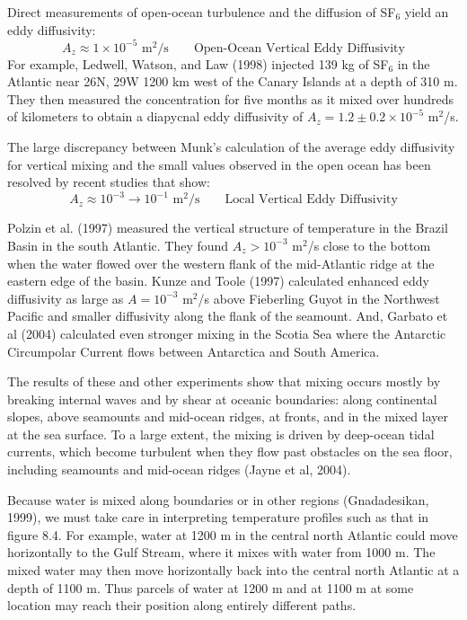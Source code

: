 Direct measurements of open-ocean
turbulence and the diffusion of
SF$_6$ yield an eddy diffusivity:
\begin{equation}
A_z \approx 1 \times 10^{-5} \text{ m$^2$/s} \qquad \text{Open-Ocean Vertical
Eddy Diffusivity}
\end{equation}
For example, Ledwell, Watson, and Law (1998) injected 139 kg of SF$_6$
in the Atlantic near 26\degrees N, 29\degrees W 1200 km west of the
Canary Islands at a depth of 310 m. They then measured the
concentration for five months as it mixed over hundreds of kilometers
to obtain a diapycnal eddy
diffusivity of
$A_z = 1.2 \pm 0.2 \times 10^{-5}$ m$^2$/s.

The large discrepancy between Munk's calculation of the average eddy
diffusivity for vertical mixing and the small values observed in the
open ocean has been resolved by recent studies that show:
\begin{equation}
A_z \approx 10^{-3} \to 10^{-1} \text{ m$^2$/s} \qquad \text{Local Vertical Eddy Diffusivity}
\end{equation}

Polzin et al. (1997) measured the vertical structure of temperature in
the Brazil Basin in the south Atlantic. They found $A_z > 10^{-3}$
m$^2$/s close to the bottom when the water flowed over the western
flank of the mid-Atlantic ridge at the eastern edge of the
basin. Kunze and Toole (1997) calculated enhanced eddy diffusivity as
large as $A= 10^{-3}$ m$^2$/s above Fieberling Guyot in the Northwest
Pacific and smaller diffusivity along the flank of the seamount. And,
Garbato et al (2004) calculated even stronger mixing in the Scotia Sea
where the Antarctic Circumpolar Current flows between Antarctica and
South America.

The results of these and other experiments show that mixing occurs
mostly by breaking internal waves and by shear at oceanic boundaries:
along continental slopes, above seamounts and mid-ocean ridges, at
fronts, and in the mixed layer at the sea
surface. To a large extent, the mixing is driven by deep-ocean tidal
currents, which
become turbulent when they flow past obstacles on the sea floor,
including seamounts and mid-ocean ridges (Jayne et al, 2004).

Because water is mixed along boundaries or in other regions
(Gnadadesikan, 1999), we must take care in interpreting temperature
profiles such as that in figure 8.4. For example, water at 1200 m in
the central north Atlantic could move horizontally to the Gulf
Stream, where it mixes with water from
1000 m. The mixed water may then move horizontally back into the
central north Atlantic at a depth of 1100 m. Thus parcels of water at
1200 m and at 1100 m at some location may reach their position along
entirely different paths.

